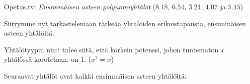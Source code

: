 {Opetus.tv: \emph{Ensimmäisen asteen polynomiyhtälöt} ($8.18$, $6.54$, $3.21$, $4.07$ ja $5.15$)}

Siirrymme nyt tarkastelemaan tärkeää yhtälöiden erikoistapausta, ensimmäisen asteen yhtälöitä.


Yhtälötyypin nimi tulee siitä, että korkein potenssi, johon tuntematon $x$ yhtälössä korotetaan, on $1$. ($x^1=x$)

\begin{esimerkki}
Seuraavat yhtälöt ovat kaikki ensimmäisen asteen yhtälöitä:
\end{esimerkki}


%		

